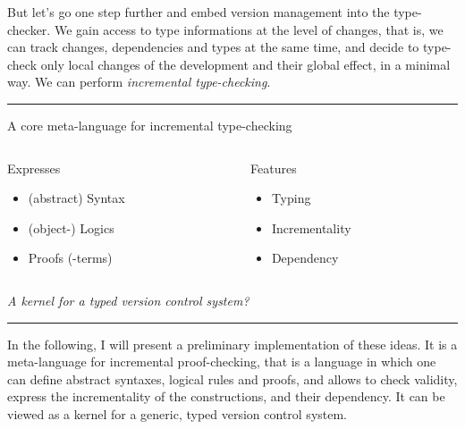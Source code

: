 \documentclass[ignorenonframetext,red]{beamer}
\begin{document}
But let's go one step further and embed version management into the
type-checker. We gain access to type informations at the level of
changes, that is, we can track changes, dependencies and types at the
same time, and decide to type-check only local changes of the
development and their global effect, in a minimal way. We can perform
\emph{incremental type-checking}.

\hrule
\begin{frame}{A core meta-language for incremental type-checking}
  \begin{columns}[t]
    \begin{column}{0.5\textwidth}
      \begin{block}{Expresses}
        \begin{itemize}
        \item (abstract) Syntax
        \item (object-) Logics
        \item Proofs (-terms)
        \end{itemize}
      \end{block}
    \end{column}
    \begin{column}{0.5\textwidth}
      \begin{block}{Features}
        \begin{itemize}
        \item Typing
        \item Incrementality
        \item Dependency
        \end{itemize}
      \end{block}
    \end{column}
  \end{columns}
  \vspace{2em}
  \begin{center}
    \emph{A kernel for a typed version control system?}
  \end{center}
\end{frame}
\hrule

In the following, I will present a preliminary implementation of these
ideas. It is a meta-language for incremental proof-checking, that is a
language in which one can define abstract syntaxes, logical rules and
proofs, and allows to check validity, express the incrementality of
the constructions, and their dependency. It can be viewed as a kernel
for a generic, typed version control system.
\end{document}
